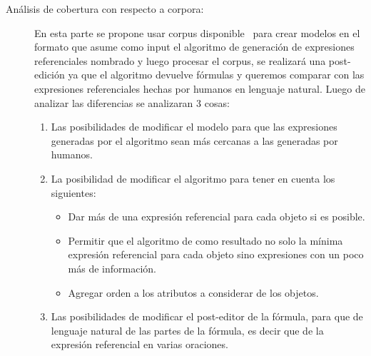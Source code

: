 \begin{description}
\item[An\'alisis de cobertura con respecto a corpora:] En esta parte se propone usar corpus disponible~\cite{viethen-dale:2011:UCNLG+Eval} para crear modelos en el formato que asume como input el algoritmo de generaci\'on de expresiones referenciales nombrado y luego procesar el corpus, se realizar\'a una post-edici\'on ya que el algoritmo devuelve f\'ormulas y queremos comparar con las expresiones referenciales hechas por humanos en lenguaje natural.
Luego de analizar las diferencias se analizaran 3 cosas:
\begin{enumerate}
\item Las posibilidades de modificar el modelo para que las expresiones generadas por el algoritmo sean m\'as cercanas a las generadas por humanos.
\item La posibilidad de modificar el algoritmo para tener en cuenta los siguientes:
  \begin{itemize}
   \item Dar m\'as de una expresi\'on referencial para cada objeto si es posible.
   \item Permitir que el algoritmo de como resultado no solo la m\'inima expresi\'on referencial para cada objeto sino expresiones con un poco m\'as de informaci\'on.
   \item Agregar orden a los atributos a considerar de los objetos.
  \end{itemize}
\item Las posibilidades de modificar el post-editor de la f\'ormula, para que de lenguaje natural de las partes de la f\'ormula, es decir que de la expresi\'on referencial en varias oraciones.
\end{enumerate}

\end{description}
